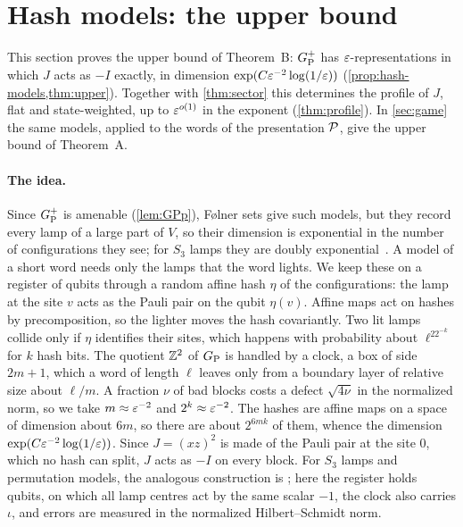 \section{Hash models: the upper bound}\label{sec:upper}

This section proves the upper bound of Theorem~B: $G_{\mathrm P}^{+}$ has $\varepsilon$-representations in which $J$ acts as $-I$ exactly, in dimension
$\exp(C\varepsilon^{-2}\log(1/\varepsilon))$ (\cref{prop:hash-models,thm:upper}). Together with \cref{thm:sector} this determines the profile of $J$,
flat and state-weighted, up to $\varepsilon^{o(1)}$ in the exponent (\cref{thm:profile}). In \cref{sec:game} the same models, applied to the
words of the presentation $\mathcal P$, give the upper bound of Theorem~A.

\paragraph{The idea.} Since $G_{\mathrm P}^{+}$ is amenable (\cref{lem:GPp}), F\o lner sets give such models, but they record every lamp of a large
part of $V$, so their dimension is exponential in the number of configurations they see; for $S_3$ lamps they are doubly
exponential~\cite[Proposition~7.3]{DM-lamps}. A model of a short word needs only the lamps that the word lights. We
keep these on a register of qubits through a random affine hash $\eta$ of the configurations: the lamp at the site $v$ acts as the Pauli
pair on the qubit $\eta(v)$. Affine maps act on hashes by precomposition, so the lighter moves the hash covariantly. Two lit lamps
collide only if $\eta$ identifies their sites, which happens with probability about $\ell^22^{-k}$ for $k$ hash bits. The quotient $\mathbb Z^2$
of $G_{\mathrm P}$ is handled by a clock, a box of side $2m+1$, which a word of length $\ell$ leaves only from a boundary layer of relative size
about $\ell/m$. A fraction $\nu$ of bad blocks costs a defect $\sqrt{4\nu}$ in the normalized norm, so we take $m\approx\varepsilon^{-2}$ and
$2^k\approx\varepsilon^{-2}$. The hashes are affine maps on a space of dimension about $6m$, so there are about $2^{6mk}$ of them, whence the
dimension $\exp(C\varepsilon^{-2}\log(1/\varepsilon))$. Since $J=(xz)^2$ is made of the Pauli pair at the site $0$, which no hash can split, $J$ acts as
$-I$ on every block. For $S_3$ lamps and permutation models, the analogous construction is \cite[Lemmas~6.1, 6.2 and
Proposition~6.3]{DM-lamps}; here the register holds qubits, on which all lamp centres act by the same scalar $-1$, the clock also carries
$\iota$, and errors are measured in the normalized Hilbert--Schmidt norm.

